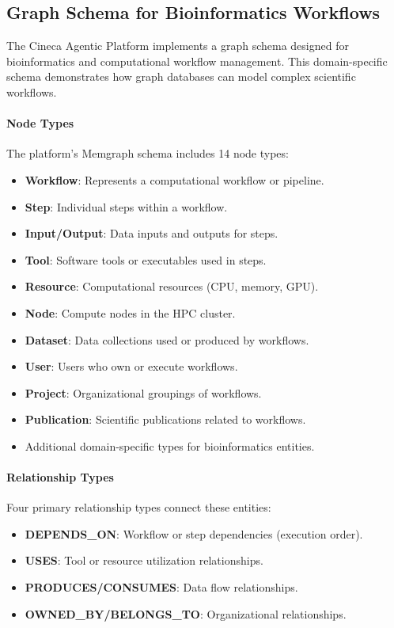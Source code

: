 \documentclass[a4paper,twoside]{sapthesis}
\begin{document}
\subsection{Graph Schema for Bioinformatics Workflows}

The Cineca Agentic Platform implements a graph schema designed for bioinformatics and computational workflow management. This domain-specific schema demonstrates how graph databases can model complex scientific workflows.

\paragraph{Node Types}

The platform's Memgraph schema includes 14 node types:

\begin{itemize}
    \item \textbf{Workflow}: Represents a computational workflow or pipeline.
    \item \textbf{Step}: Individual steps within a workflow.
    \item \textbf{Input/Output}: Data inputs and outputs for steps.
    \item \textbf{Tool}: Software tools or executables used in steps.
    \item \textbf{Resource}: Computational resources (CPU, memory, GPU).
    \item \textbf{Node}: Compute nodes in the HPC cluster.
    \item \textbf{Dataset}: Data collections used or produced by workflows.
    \item \textbf{User}: Users who own or execute workflows.
    \item \textbf{Project}: Organizational groupings of workflows.
    \item \textbf{Publication}: Scientific publications related to workflows.
    \item Additional domain-specific types for bioinformatics entities.
\end{itemize}

\paragraph{Relationship Types}

Four primary relationship types connect these entities:

\begin{itemize}
    \item \textbf{DEPENDS\_ON}: Workflow or step dependencies (execution order).
    \item \textbf{USES}: Tool or resource utilization relationships.
    \item \textbf{PRODUCES/CONSUMES}: Data flow relationships.
    \item \textbf{OWNED\_BY/BELONGS\_TO}: Organizational relationships.
\end{itemize}
\end{document}

